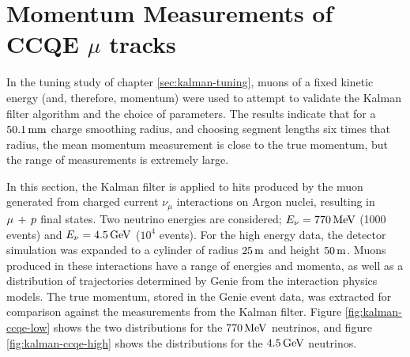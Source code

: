 \section{Momentum Measurements of CCQE $\mu$ tracks}
In the tuning study of chapter \ref{sec:kalman-tuning}, muons of a fixed kinetic energy (and, therefore, momentum) were used to attempt to validate the Kalman filter algorithm and the choice of parameters. The results indicate that for a $50.1\mm$ charge smoothing radius, and choosing segment lengths six times that radius, the mean momentum measurement is close to the true momentum, but the range of measurements is extremely large.

In this section, the Kalman filter is applied to hits produced by the muon generated from charged current $\nu_\mu$ interactions on Argon nuclei, resulting in $\ccqe$ final states. Two neutrino energies are considered; $E_\nu = 770\MeV$ (1000 events) and $E_\nu = 4.5\GeV$ ($10^4$ events). For the high energy data, the detector simulation was expanded to a cylinder of radius $25\metre$ and height $50\metre$. Muons produced in these interactions have a range of energies and momenta, as well as a distribution of trajectories determined by Genie from the interaction physics models. The true momentum, stored in the Genie event data, was extracted for comparison against the measurements from the Kalman filter. Figure \ref{fig:kalman-ccqe-low} shows the two distributions for the $770\MeV$ neutrinos, and figure \ref{fig:kalman-ccqe-high} shows the distributions for the $4.5\GeV$ neutrinos.

